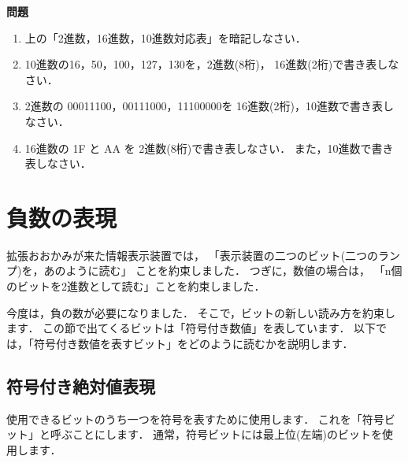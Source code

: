 {\small
\begin{center}
\end{center}
}
\vspace{0.2cm}
\begin{flushleft}
{\bf 問題}
\end{flushleft}
\begin{enumerate}
\item
上の「2進数，16進数，10進数対応表」を暗記しなさい．
\item
10進数の16，50，100，127，130を，2進数(8桁)，
16進数(2桁)で書き表しなさい．
\item
2進数の 00011100，00111000，11100000を
16進数(2桁)，10進数で書き表しなさい．
\item
16進数の 1F と AA を
2進数(8桁)で書き表しなさい．
また，10進数で書き表しなさい．
\end{enumerate}

\section{負数の表現}
\label{minus}
拡張おおかみが来た情報表示装置では，
「表示装置の二つのビット(二つのランプ)を，あのように読む」
ことを約束しました．
つぎに，数値の場合は，
「n個のビットを2進数として読む」ことを約束しました．

今度は，負の数が必要になりました．
そこで，ビットの新しい読み方を約束します．
この節で出てくるビットは「符号付き数値」を表しています．
以下では，「符号付き数値を表すビット」をどのように読むかを説明します．

\subsection{符号付き絶対値表現}
使用できるビットのうち一つを符号を表すために使用します．
これを「符号ビット」と呼ぶことにします．
通常，符号ビットには最上位(左端)のビットを使用します．

